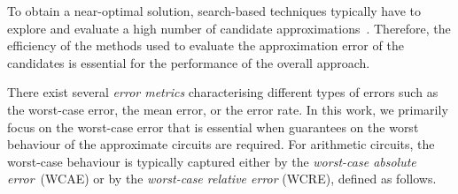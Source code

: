 \documentclass[runningheads]{llncs}
\begin{document}
To obtain a near-optimal solution, search-based techniques typically have to
explore and evaluate a high number of candidate
approximations~\cite{approx-So-Mo-CGP'15}. Therefore, the efficiency of the
methods used to evaluate the approximation error of the candidates is essential
for the performance of the overall approach. 




\vspace{0.5em}

There exist several \emph{error metrics} characterising different types of
errors such as the worst-case error, the mean error, or the error rate. In this
work, we primarily focus on the worst-case error that is essential when
guarantees on the worst behaviour of the approximate circuits are required.  For
arithmetic circuits, the worst-case behaviour is typically captured either by
the \emph{worst-case absolute error}~(WCAE) or by the \emph{worst-case relative
error} (WCRE), defined as follows.
\end{document}
